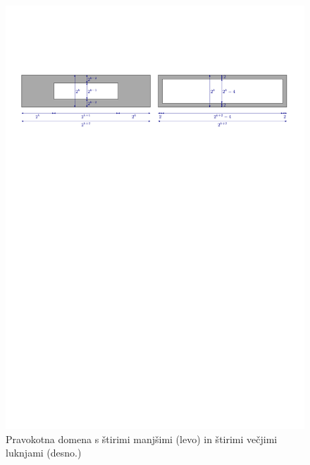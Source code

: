 \documentclass[a4paper, 12pt]{book}
\begin{document}
\begin{figure}[htp]
\centerline{\includegraphics[scale=0.75, page=2]{pics/data_generation.pdf}}
\caption{Pravokotna domena s štirimi manjšimi (levo) in štirimi večjimi luknjami (desno.)}
\label{generation2}
\end{figure}
\end{document}
